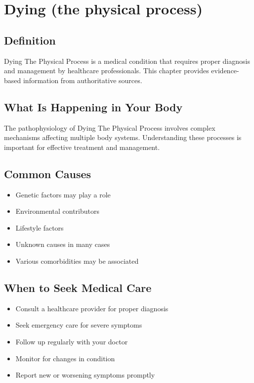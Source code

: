 
\chapter{Dying (the physical process)}

\section*{Definition}
Dying The Physical Process is a medical condition that requires proper diagnosis and management by healthcare professionals. This chapter provides evidence-based information from authoritative sources.

\section*{What Is Happening in Your Body}
The pathophysiology of Dying The Physical Process involves complex mechanisms affecting multiple body systems. Understanding these processes is important for effective treatment and management.

\section*{Common Causes}
\begin{itemize}
  \item Genetic factors may play a role
  \item Environmental contributors
  \item Lifestyle factors
  \item Unknown causes in many cases
  \item Various comorbidities may be associated
\end{itemize}

\section*{When to Seek Medical Care}
\begin{itemize}
  \item Consult a healthcare provider for proper diagnosis
  \item Seek emergency care for severe symptoms
  \item Follow up regularly with your doctor
  \item Monitor for changes in condition
  \item Report new or worsening symptoms promptly
\end{itemize}

